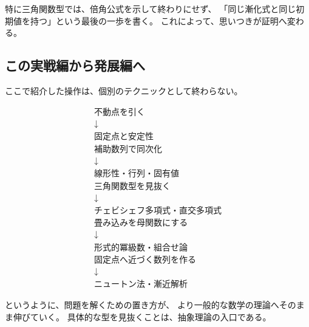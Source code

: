 特に三角関数型では、倍角公式を示して終わりにせず、
「同じ漸化式と同じ初期値を持つ」という最後の一歩を書く。
これによって、思いつきが証明へ変わる。

\subsection{この実戦編から発展編へ}

ここで紹介した操作は、個別のテクニックとして終わらない。

\[
  \begin{array}{c}
    \text{不動点を引く}          \\
    \downarrow             \\
    \text{固定点と安定性}         \\[2mm]
    \text{補助数列で同次化}        \\
    \downarrow             \\
    \text{線形性・行列・固有値}      \\[2mm]
    \text{三角関数型を見抜く}       \\
    \downarrow             \\
    \text{チェビシェフ多項式・直交多項式} \\[2mm]
    \text{畳み込みを母関数にする}     \\
    \downarrow             \\
    \text{形式的冪級数・組合せ論}     \\[2mm]
    \text{固定点へ近づく数列を作る}    \\
    \downarrow             \\
    \text{ニュートン法・漸近解析}
  \end{array}
\]

というように、問題を解くための置き方が、
より一般的な数学の理論へそのまま伸びていく。
具体的な型を見抜くことは、抽象理論の入口である。

